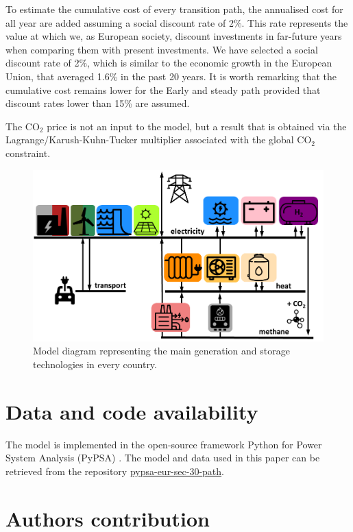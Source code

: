 \documentclass[5p]{elsarticle} %
\begin{document}
To estimate the cumulative cost of every transition path, the annualised cost for all year are added assuming a social discount rate of 2\%. This rate represents the value at which we, as European society, discount investments in far-future years when comparing them with present investments. We have selected a social discount rate of 2\%, which is similar to the economic growth in the European Union, that averaged 1.6\% in the past 20 years. It is worth remarking that the cumulative cost remains lower for the Early and steady path provided that discount rates lower than 15\% are assumed.

 The CO$_2$ price is not an input to the model, but a result that is obtained via the Lagrange/Karush-Kuhn-Tucker multiplier associated with the global CO$_2$ constraint. 


\begin{figure}[!h]
\centering
\includegraphics[width=\columnwidth]{../figures/model.png}
\caption{Model diagram representing the main generation and storage technologies in every country.} \label{fig_model} 
\end{figure}

\section{Data and code availability}

The model is implemented in the open-source framework Python for Power System Analysis (PyPSA) \cite{PyPSA}. The model and data used in this paper can be retrieved from the repository \href{https://github.com/martavp/pypsa-eur-sec-30-path}{pypsa-eur-sec-30-path}.

\section{Authors contribution}
\end{document}
